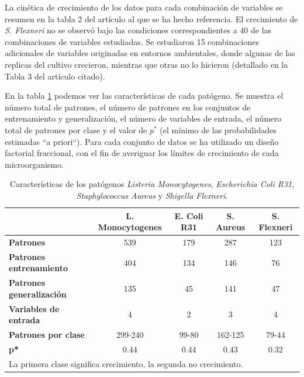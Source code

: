 \begin{description}
La cinética de crecimiento de los datos para cada combinación de variables se resumen en
la tabla 2 del artículo al que se ha hecho referencia. El crecimiento de \textit{S.
Flexneri} no
se observó bajo las condiciones correspondientes a 40 de las combinaciones de variables
estudiadas. Se estudiaron 15 combinaciones adicionales de variables originadas en entornos
ambientales, donde algunas de las replicas del cultivo crecieron, mientras que
otras no lo hicieron (detallado en la Tabla 3 del artículo citado).
\end{description}

En la tabla \ref{tabla1aplica} podemos ver las características de cada
patógeno. Se muestra el número total de patrones, el
número de patrones en los conjuntos de entrenamiento y generalización, el número de
variables de entrada, el número total de patrones por clase y el valor de $p^*$ (el
mínimo de las probabilidades estimadas ``a priori``). Para cada conjunto de datos se ha
utilizado un diseño factorial fraccional, con el fin de
averiguar los límites de crecimiento de cada microorganismo.

\begin{table}[!htb]
\scriptsize
\caption{Características de los patógenos \textit{Listeria Monocytogenes},
\textit{Escherichia Coli R31}, \textit{Staphylococcus Aureus} y \textit{Shigella
Flexneri}.}
\label{tabla1aplica}
\centering
\tabcolsep 4pt
\begin{tabular}{lcccc} \hline
\rowcolor[rgb]{0.70,0.85,1} & \textbf{L. Monocytogenes} &
\textbf{E. Coli R31} & \textbf{S. Aureus} & \textbf{S. Flexneri} \\ \hline
\rowcolor[rgb]{0.86,0.94,1} \textbf{Patrones} & 539 & 179 & 287 & 123 \\
\rowcolor[rgb]{0.86,0.94,1} \textbf{Patrones entrenamiento} & 404 & 134 & 146 & 76 \\
\rowcolor[rgb]{0.86,0.94,1}  \textbf{Patrones generalización} & 135 & 45 & 141 & 47 \\
\rowcolor[rgb]{0.86,0.94,1} \textbf{Variables de entrada} & 4 & 2 & 3 & 4 \\
\rowcolor[rgb]{0.86,0.94,1} \textbf{Patrones por clase} & 299-240 & 99-80 & 162-125 &
79-44 \\
\rowcolor[rgb]{0.86,0.94,1} \textbf{p*} & 0.44 & 0.44 & 0.43 & 0.32 \\ \hline
\multicolumn{4}{l}{La primera clase significa crecimiento, la segunda no crecimiento.}
\end{tabular}
\end{table}

